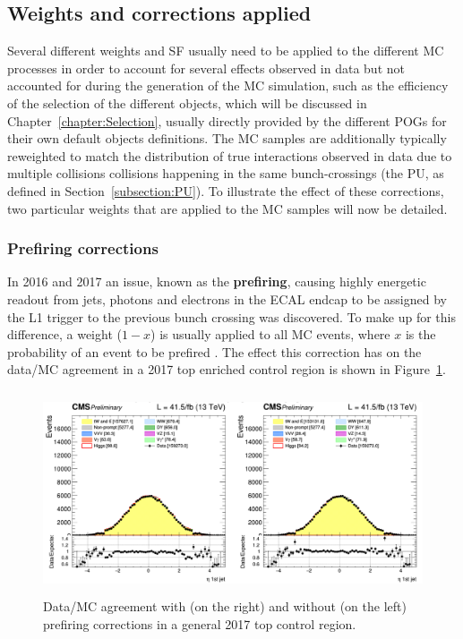 \documentclass[a4paper, 10pt, openright]{report}
\begin{document}
\subsection{Weights and corrections applied} \label{subsection:Weights}

Several different weights and \ac{SF} usually need to be applied to the different \ac{MC} processes in order to account for several effects observed in data but not accounted for during the generation of the \ac{MC} simulation, such as the efficiency of the selection of the different objects, which will be discussed in Chapter~\ref{chapter:Selection}, usually directly provided by the different \acfp{POG} for their own default objects definitions.  The \ac{MC} samples are additionally typically reweighted to match the distribution of true interactions observed in data due to multiple collisions collisions happening in the same bunch-crossings (the \ac{PU}, as defined in Section~\ref{subsection:PU}). To illustrate the effect of these corrections, two particular weights that are applied to the \ac{MC} samples will now be detailed.

\subsubsection{Prefiring corrections}

In 2016 and 2017 an issue, known as the \textbf{prefiring}, causing highly energetic readout from jets, photons and electrons in the \ac{ECAL} endcap to be assigned by the \ac{L1} trigger to the previous bunch crossing was discovered. To make up for this difference, a weight ($1-x$) is usually applied to all \ac{MC} events, where $x$ is the probability of an event to be prefired \cite{Prefire}. The effect this correction has on the data/\ac{MC} agreement in a 2017 top enriched control region is shown in Figure~\ref{fig:Prefiring}.

\begin{figure}[htbp]
\begin{center}
\includegraphics[width=14cm, height=6cm]{figs/Prefiring.png}
\caption{Data/\ac{MC} agreement with (on the right) and without (on the left) prefiring corrections in a general 2017 top control region.}
\label{fig:Prefiring}
\end{center}
\end{figure}
\end{document}

